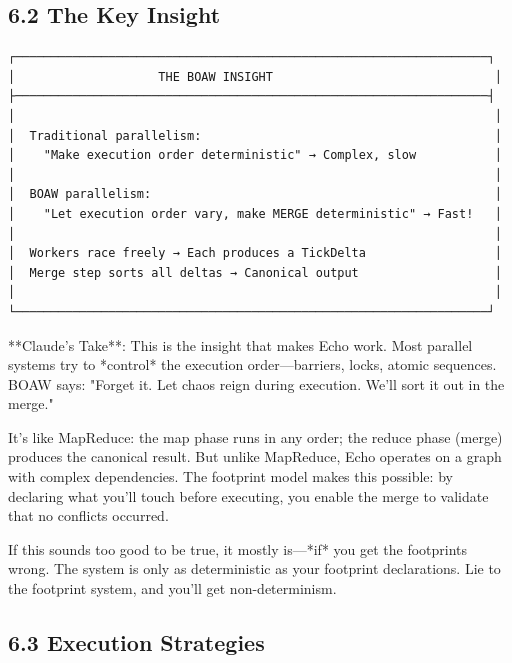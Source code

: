 \documentclass[
  11pt,
]{book}
\begin{document}
\subsection{6.2 The Key Insight}\label{the-key-insight}

\begin{verbatim}
┌──────────────────────────────────────────────────────────────────┐
│                    THE BOAW INSIGHT                               │
├──────────────────────────────────────────────────────────────────┤
│                                                                   │
│  Traditional parallelism:                                         │
│    "Make execution order deterministic" → Complex, slow           │
│                                                                   │
│  BOAW parallelism:                                                │
│    "Let execution order vary, make MERGE deterministic" → Fast!   │
│                                                                   │
│  Workers race freely → Each produces a TickDelta                  │
│  Merge step sorts all deltas → Canonical output                   │
│                                                                   │
└──────────────────────────────────────────────────────────────────┘
\end{verbatim}

\begin{claudecommentary}
**Claude's Take**: This is the insight that makes Echo work. Most parallel systems try to *control* the execution order—barriers, locks, atomic sequences. BOAW says: "Forget it. Let chaos reign during execution. We'll sort it out in the merge."

It's like MapReduce: the map phase runs in any order; the reduce phase (merge) produces the canonical result. But unlike MapReduce, Echo operates on a graph with complex dependencies. The footprint model makes this possible: by declaring what you'll touch before executing, you enable the merge to validate that no conflicts occurred.

If this sounds too good to be true, it mostly is—*if* you get the footprints wrong. The system is only as deterministic as your footprint declarations. Lie to the footprint system, and you'll get non-determinism.
\end{claudecommentary}

\subsection{6.3 Execution Strategies}\label{execution-strategies}
\end{document}
